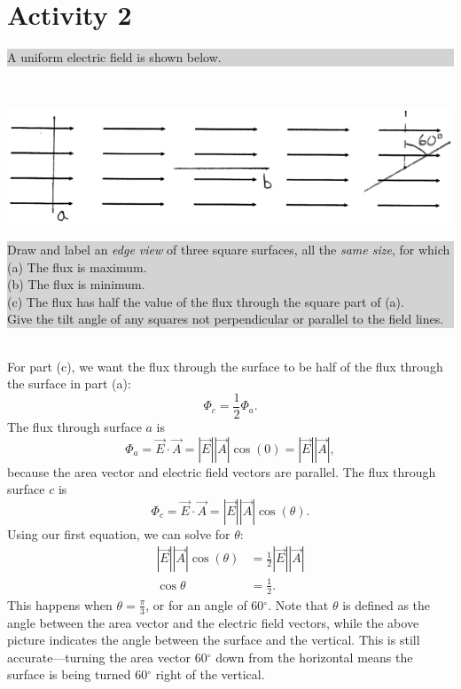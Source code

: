 \documentclass[]{article}
\newcommand{\excerpt}[1]{\colorbox{lightgray}{\parbox{14.8cm}{#1}} \\}
\begin{document}
\vspace{-40pt}

\section*{Activity 2}%
\excerpt{
A uniform electric field is shown below.
}
\begin{center}
	\includegraphics[scale=0.5]{A2Sol}%
\end{center}
\excerpt{
Draw and label an \textit{edge view} of three square surfaces, all the \textit{same size}, for which \\
(a) The flux is maximum. \\
(b) The flux is minimum. \\
(c) The flux has half the value of the flux through the square part of (a). \\
Give the tilt angle of any squares not perpendicular or parallel to the field lines.
}
For part (c), we want the flux through the surface to be half of the flux through the surface in part (a):
\[
\Phi_{c} = \frac{1}{2}\Phi_{a}.
\]
The flux through surface $a$ is
\[
\Phi_{a} = \vec{E}\cdot\vec{A} = \left|\vec{E}\right|\left|\vec{A}\right|\cos(0) = \left|\vec{E}\right|\left|\vec{A}\right|,
\]
because the area vector and electric field vectors are parallel. The flux through surface $c$ is
\[
\Phi_{c} = \vec{E}\cdot\vec{A} = \left|\vec{E}\right|\left|\vec{A}\right|\cos(\theta).
\]
Using our first equation, we can solve for $\theta$:
\[
\begin{split}
	\left|\vec{E}\right|\left|\vec{A}\right|\cos(\theta) & = \frac{1}{2}\left|\vec{E}\right|\left|\vec{A}\right| \\
	\cos\theta & = \frac{1}{2}.
\end{split}
\]
This happens when $\theta=\frac{\pi}{3}$, or for an angle of 60$^{\circ}$. Note that $\theta$ is defined as the angle between the area vector and the electric field vectors, while the above picture indicates the angle between the surface and the vertical. This is still accurate---turning the area vector 60$^{\circ}$ down from the horizontal means the surface is being turned 60$^{\circ}$ right of the vertical.
\end{document}
